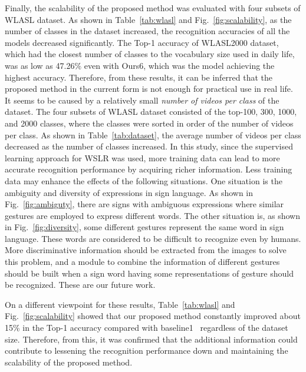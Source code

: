 \documentclass[journal]{IEEEtran}
\begin{document}
Finally, the scalability of the proposed method was evaluated with four subsets of WLASL dataset.
As shown in Table~\ref{tab:wlasl} and Fig.~\ref{fig:scalability}, as the number of classes in the dataset increased, the recognition accuracies of all the models decreased significantly.
The Top-1 accuracy of WLASL2000 dataset, which had the closest number of classes to the vocabulary size used in daily life, was as low as 47.26\% even with Ours6, which was the model achieving the highest accuracy.
Therefore, from these results, it can be inferred that the proposed method in the current form is not enough for practical use in real life.
It seems to be caused by a relatively small \textit{number of videos per class} of the dataset.
The four subsets of WLASL dataset consisted of the top-100, 300, 1000, and 2000 classes, where the classes were sorted in order of the number of videos per class.
As shown in Table~\ref{tab:dataset}, the average number of videos per class decreased as the number of classes increased.
In this study, since the supervised learning approach for WSLR was used, more training data can lead to more accurate recognition performance by acquiring richer information.
Less training data may enhance the effects of the following situations.
One situation is the ambiguity and diversity of expressions in sign language.
As shown in Fig.~\ref{fig:ambiguty}, there are signs with ambiguous expressions where similar gestures are employed to express different words.
The other situation is, as shown in Fig.~\ref{fig:diversity}, some different gestures represent the same word in sign language.
These words are considered to be difficult to recognize even by humans.
More discriminative information should be extracted from the images to solve this problem, and a module to combine the information of different gestures should be built when a sign word having some representations of gesture should be recognized.
These are our future work.

On a different viewpoint for these results, Table~\ref{tab:wlasl} and Fig.~\ref{fig:scalability} showed that our proposed method constantly improved about 15\% in the Top-1 accuracy compared with baseline1~\cite{li2020word} regardless of the dataset size. 
Therefore, from this, it was confirmed that the additional information could contribute to lessening the recognition performance down and maintaining the scalability of the proposed method. 
\end{document}
